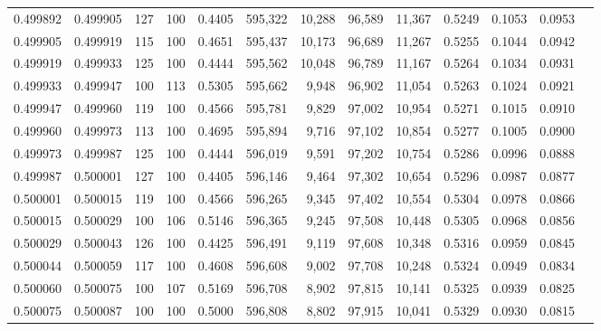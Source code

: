 \begin{tabular}{rrrrrrrrrrrrr}
0.499892 & 0.499905 &   127 & 100 &                                     0.4405 & 595,322 &  10,288 &  96,589 &  11,367 & 0.5249 & 0.1053 & 0.0953 \\
0.499905 & 0.499919 &   115 & 100 &                                     0.4651 & 595,437 &  10,173 &  96,689 &  11,267 & 0.5255 & 0.1044 & 0.0942 \\
0.499919 & 0.499933 &   125 & 100 &                                     0.4444 & 595,562 &  10,048 &  96,789 &  11,167 & 0.5264 & 0.1034 & 0.0931 \\
0.499933 & 0.499947 &   100 & 113 &                                     0.5305 & 595,662 &   9,948 &  96,902 &  11,054 & 0.5263 & 0.1024 & 0.0921 \\
0.499947 & 0.499960 &   119 & 100 &                                     0.4566 & 595,781 &   9,829 &  97,002 &  10,954 & 0.5271 & 0.1015 & 0.0910 \\
0.499960 & 0.499973 &   113 & 100 &                                     0.4695 & 595,894 &   9,716 &  97,102 &  10,854 & 0.5277 & 0.1005 & 0.0900 \\
0.499973 & 0.499987 &   125 & 100 &                                     0.4444 & 596,019 &   9,591 &  97,202 &  10,754 & 0.5286 & 0.0996 & 0.0888 \\
0.499987 & 0.500001 &   127 & 100 &                                     0.4405 & 596,146 &   9,464 &  97,302 &  10,654 & 0.5296 & 0.0987 & 0.0877 \\
0.500001 & 0.500015 &   119 & 100 &                                     0.4566 & 596,265 &   9,345 &  97,402 &  10,554 & 0.5304 & 0.0978 & 0.0866 \\
0.500015 & 0.500029 &   100 & 106 &                                     0.5146 & 596,365 &   9,245 &  97,508 &  10,448 & 0.5305 & 0.0968 & 0.0856 \\
0.500029 & 0.500043 &   126 & 100 &                                     0.4425 & 596,491 &   9,119 &  97,608 &  10,348 & 0.5316 & 0.0959 & 0.0845 \\
0.500044 & 0.500059 &   117 & 100 &                                     0.4608 & 596,608 &   9,002 &  97,708 &  10,248 & 0.5324 & 0.0949 & 0.0834 \\
0.500060 & 0.500075 &   100 & 107 &                                     0.5169 & 596,708 &   8,902 &  97,815 &  10,141 & 0.5325 & 0.0939 & 0.0825 \\
0.500075 & 0.500087 &   100 & 100 &                                     0.5000 & 596,808 &   8,802 &  97,915 &  10,041 & 0.5329 & 0.0930 & 0.0815 \\

\end{tabular}
